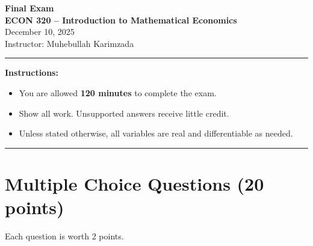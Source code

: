 \documentclass[12pt]{article}
\begin{document}
\begin{center}
{\Large \textbf{Final Exam}} \\[0.9em]
\textbf{ECON 320 -- Introduction to Mathematical Economics} \\[0.7em]

December 10, 2025
 \\[0.8em]
Instructor: Muhebullah Karimzada
\end{center}

\hrule

\textbf{Instructions:}
\begin{itemize}
\item You are allowed \textbf{120 minutes} to complete the exam.
    \item Show all work. Unsupported answers receive little credit.

    \item Unless stated otherwise, all variables are real and differentiable as needed.
\end{itemize}

\hrule

\section*{Multiple Choice Questions (20 points)}
Each question is worth 2 points.\\
\end{document}
